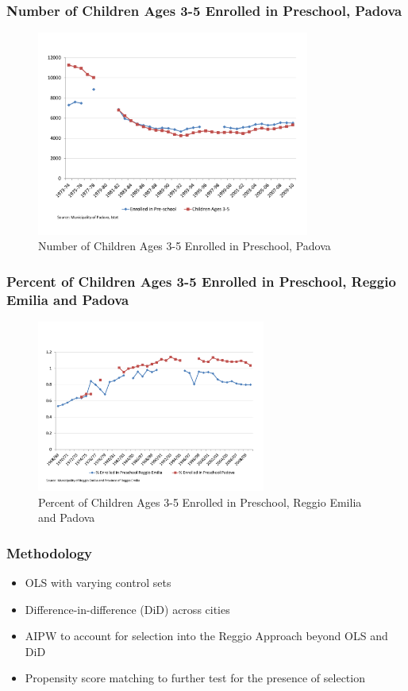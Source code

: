 \documentclass[static]{JJH-Beamer_PAGENOS}
\begin{document}
\begin{frame}
\frametitle{Number of Children Ages 3-5 Enrolled in Preschool, Padova}
\centering
\begin{figure}[H]
\caption{Number of Children Ages 3-5 Enrolled in Preschool, Padova}
\includegraphics[width=0.8\textwidth]{../../output/image/Enrollement_Preschool_Padova.pdf}
\end{figure}
\end{frame}

\begin{frame}
\frametitle{Percent of Children Ages 3-5 Enrolled in Preschool, Reggio Emilia and Padova}
\centering
\begin{figure}[H]
\caption{Percent of Children Ages 3-5 Enrolled in Preschool, Reggio Emilia and Padova}
\includegraphics[width=0.67\textwidth]{../../output/image/Enrollement_Preschool_age3-5.pdf}
\end{figure}
\end{frame}

\begin{frame}
\frametitle{Methodology}
\begin{itemize}
	\item OLS with varying control sets 
	\item Difference-in-difference (DiD) across cities 
	\item AIPW to account for selection into the Reggio Approach beyond OLS and DiD
	\item Propensity score matching to further test for the presence of selection 
\end{itemize}
\end{frame}
\end{document}
